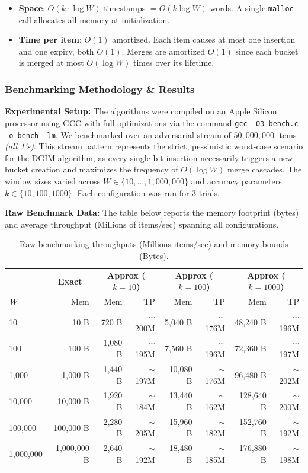 \documentclass[11pt]{article}
\begin{document}
\begin{itemize}
\item \textbf{Space}: $O(k \cdot \log W)$ timestamps $= O(k \log W)$ words. A single \texttt{malloc} call allocates all memory at initialization.
\item \textbf{Time per item}: $O(1)$ amortized. Each item causes at most one insertion and one expiry, both $O(1)$. Merges are amortized $O(1)$ since each bucket is merged at most $O(\log W)$ times over its lifetime.
\end{itemize}

\subsubsection*{Benchmarking Methodology \& Results}

\textbf{Experimental Setup:} The algorithms were compiled on an Apple Silicon processor using GCC with full optimizations via the command \texttt{gcc -O3 bench.c -o bench -lm}. We benchmarked over an adversarial stream of $50{,}000{,}000$ items \textit{(all 1's)}. This stream pattern represents the strict, pessimistic worst-case scenario for the DGIM algorithm, as every single bit insertion necessarily triggers a new bucket creation and maximizes the frequency of $O(\log W)$ merge cascades. The window sizes varied across $W \in \{10, \dots, 1{,}000{,}000\}$ and accuracy parameters $k \in \{10, 100, 1000\}$. Each configuration was run for 3 trials.

\textbf{Raw Benchmark Data:} The table below reports the memory footprint (bytes) and average throughput (Millions of items/sec) spanning all configurations. 

\begin{table}[ht!]
\centering
\begin{tabular}{l|r|rr|rr|rr}
\toprule
& \multicolumn{1}{c|}{\textbf{Exact}} & \multicolumn{2}{c|}{\textbf{Approx ($k=10$)}} & \multicolumn{2}{c|}{\textbf{Approx ($k=100$)}} & \multicolumn{2}{c}{\textbf{Approx ($k=1000$)}} \\
\textit{W} & Mem & Mem & TP & Mem & TP & Mem & TP \\
\midrule
10          & 10 B & 720 B & $\sim$200M     & 5,040 B & $\sim$176M     & 48,240 B & $\sim$196M \\
100         & 100 B & 1,080 B & $\sim$195M   & 7,560 B & $\sim$196M     & 72,360 B & $\sim$197M \\
1,000       & 1,000 B & 1,440 B & $\sim$197M   & 10,080 B & $\sim$176M    & 96,480 B & $\sim$202M \\
10,000      & 10,000 B & 1,920 B & $\sim$184M   & 13,440 B & $\sim$162M    & 128,640 B & $\sim$200M \\
100,000     & 100,000 B & 2,280 B & $\sim$205M   & 15,960 B & $\sim$182M    & 152,760 B & $\sim$192M \\
1,000,000   & 1,000,000 B & 2,640 B & $\sim$192M   & 18,480 B & $\sim$185M    & 176,880 B & $\sim$198M \\
\bottomrule
\end{tabular}
\caption{Raw benchmarking throughputs (Millions items/sec) and memory bounds (Bytes).}
\end{table}
\end{document}
